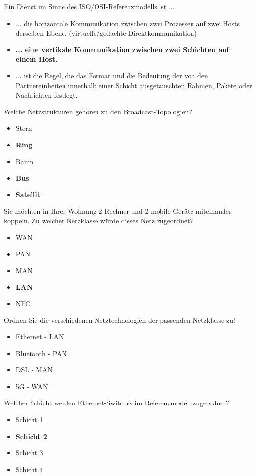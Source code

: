 \documentclass{article}
\begin{document}
	Ein Dienst im Sinne des ISO/OSI-Referenzmodells ist ... 
	\begin{itemize}
		\item ... die horizontale Kommunikation zwischen zwei Prozessen auf zwei Hosts derselben Ebene. (virtuelle/gedachte Direktkommunikation)
		\item \textbf{... eine vertikale Kommunikation zwischen zwei Schichten auf einem Host.}
		\item  ... ist die Regel, die das Format und die Bedeutung der von den Partnereinheiten innerhalb einer Schicht ausgetauschten Rahmen, Pakete oder Nachrichten festlegt.  
	\end{itemize}

	Welche Netzstrukturen gehören zu den Broadcast-Topologien? 
	\begin{itemize}
		\item Stern
		\item \textbf{Ring}
		\item Baum
		\item \textbf{Bus}
		\item \textbf{Satellit}
	\end{itemize}

	Sie möchten in Ihrer Wohnung 2 Rechner und 2 mobile Geräte miteinander koppeln. Zu welcher Netzklasse würde dieses Netz zugeordnet?
	\begin{itemize}
		\item WAN
		\item PAN
		\item MAN
		\item \textbf{LAN}
		\item NFC
	\end{itemize}

	Ordnen Sie die verschiedenen Netztechnologien der passenden Netzklasse zu! 
	\begin{itemize}
		\item Ethernet - LAN
		\item Bluetooth - PAN
		\item DSL - MAN
		\item 5G - WAN
	\end{itemize}

	 Welcher Schicht werden Ethernet-Switches im Referenzmodell zugeordnet?
	 \begin{itemize}
	 	\item Schicht 1
	 	\item \textbf{Schicht 2}
	 	\item Schicht 3
	 	\item Schicht 4
	 \end{itemize}
 
\end{document}
